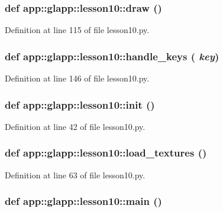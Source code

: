 \subsubsection{\setlength{\rightskip}{0pt plus 5cm}def app::glapp::lesson10::draw ()}\label{namespaceapp_1_1glapp_1_1lesson10_c09aebec73c8182b456fc00e141737fe}




Definition at line 115 of file lesson10.py.
\subsubsection{\setlength{\rightskip}{0pt plus 5cm}def app::glapp::lesson10::handle\_\-keys ( {\em key})}\label{namespaceapp_1_1glapp_1_1lesson10_c35ae3c3fee3eef0ae380c85828f2add}




Definition at line 146 of file lesson10.py.
\subsubsection{\setlength{\rightskip}{0pt plus 5cm}def app::glapp::lesson10::init ()}\label{namespaceapp_1_1glapp_1_1lesson10_630db77d37125bc2534ec4dca0700af3}




Definition at line 42 of file lesson10.py.
\subsubsection{\setlength{\rightskip}{0pt plus 5cm}def app::glapp::lesson10::load\_\-textures ()}\label{namespaceapp_1_1glapp_1_1lesson10_818df7357b3b2ade400a3c8088821f60}




Definition at line 63 of file lesson10.py.
\subsubsection{\setlength{\rightskip}{0pt plus 5cm}def app::glapp::lesson10::main ()}\label{namespaceapp_1_1glapp_1_1lesson10_fa9657e5fbe07af7aceaa9ad695640c5}




